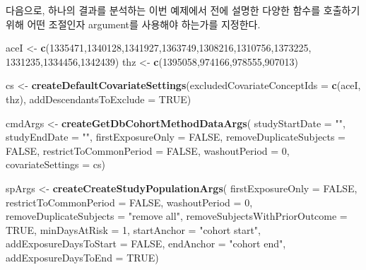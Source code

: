 \documentclass[10.5pt]{book}
\newenvironment{Shaded}{\begin{snugshade}}{\end{snugshade}}
\newcommand{\KeywordTok}[1]{\textcolor[rgb]{0.13,0.29,0.53}{\textbf{#1}}}
\newcommand{\DataTypeTok}[1]{\textcolor[rgb]{0.13,0.29,0.53}{#1}}
\newcommand{\DecValTok}[1]{\textcolor[rgb]{0.00,0.00,0.81}{#1}}
\newcommand{\StringTok}[1]{\textcolor[rgb]{0.31,0.60,0.02}{#1}}
\newcommand{\OtherTok}[1]{\textcolor[rgb]{0.56,0.35,0.01}{#1}}
\newcommand{\NormalTok}[1]{#1}
\theoremstyle{definition}
\theoremstyle{definition}
\theoremstyle{definition}
\theoremstyle{remark}
\begin{document}
다음으로, 하나의 결과를 분석하는 이번 예제에서 전에 설명한 다양한 함수를
호출하기 위해 어떤 조절인자 argument를 사용해야 하는가를 지정한다.

\begin{Shaded}
\begin{Highlighting}[]
\NormalTok{aceI <-}\StringTok{ }\KeywordTok{c}\NormalTok{(}\DecValTok{1335471}\NormalTok{,}\DecValTok{1340128}\NormalTok{,}\DecValTok{1341927}\NormalTok{,}\DecValTok{1363749}\NormalTok{,}\DecValTok{1308216}\NormalTok{,}\DecValTok{1310756}\NormalTok{,}\DecValTok{1373225}\NormalTok{,}
          \DecValTok{1331235}\NormalTok{,}\DecValTok{1334456}\NormalTok{,}\DecValTok{1342439}\NormalTok{)}
\NormalTok{thz <-}\StringTok{ }\KeywordTok{c}\NormalTok{(}\DecValTok{1395058}\NormalTok{,}\DecValTok{974166}\NormalTok{,}\DecValTok{978555}\NormalTok{,}\DecValTok{907013}\NormalTok{)}

\NormalTok{cs <-}\StringTok{ }\KeywordTok{createDefaultCovariateSettings}\NormalTok{(}\DataTypeTok{excludedCovariateConceptIds =} \KeywordTok{c}\NormalTok{(aceI,}
\NormalTok{                                                                     thz),}
                                     \DataTypeTok{addDescendantsToExclude =} \OtherTok{TRUE}\NormalTok{)}

\NormalTok{cmdArgs <-}\StringTok{ }\KeywordTok{createGetDbCohortMethodDataArgs}\NormalTok{(}
  \DataTypeTok{studyStartDate =} \StringTok{""}\NormalTok{,}
  \DataTypeTok{studyEndDate =} \StringTok{""}\NormalTok{,}
  \DataTypeTok{firstExposureOnly =} \OtherTok{FALSE}\NormalTok{,}
  \DataTypeTok{removeDuplicateSubjects =} \OtherTok{FALSE}\NormalTok{,}
  \DataTypeTok{restrictToCommonPeriod =} \OtherTok{FALSE}\NormalTok{,}
  \DataTypeTok{washoutPeriod =} \DecValTok{0}\NormalTok{,}
  \DataTypeTok{covariateSettings =}\NormalTok{ cs)}

\NormalTok{spArgs <-}\StringTok{ }\KeywordTok{createCreateStudyPopulationArgs}\NormalTok{(}
  \DataTypeTok{firstExposureOnly =} \OtherTok{FALSE}\NormalTok{,}
  \DataTypeTok{restrictToCommonPeriod =} \OtherTok{FALSE}\NormalTok{,}
  \DataTypeTok{washoutPeriod =} \DecValTok{0}\NormalTok{,}
  \DataTypeTok{removeDuplicateSubjects =} \StringTok{"remove all"}\NormalTok{,}
  \DataTypeTok{removeSubjectsWithPriorOutcome =} \OtherTok{TRUE}\NormalTok{,}
  \DataTypeTok{minDaysAtRisk =} \DecValTok{1}\NormalTok{,}
  \DataTypeTok{startAnchor =} \StringTok{"cohort start"}\NormalTok{,}
  \DataTypeTok{addExposureDaysToStart =} \OtherTok{FALSE}\NormalTok{,}
  \DataTypeTok{endAnchor =} \StringTok{"cohort end"}\NormalTok{,}
  \DataTypeTok{addExposureDaysToEnd =} \OtherTok{TRUE}\NormalTok{)}


\end{Highlighting}
\end{Shaded}
\end{document}
